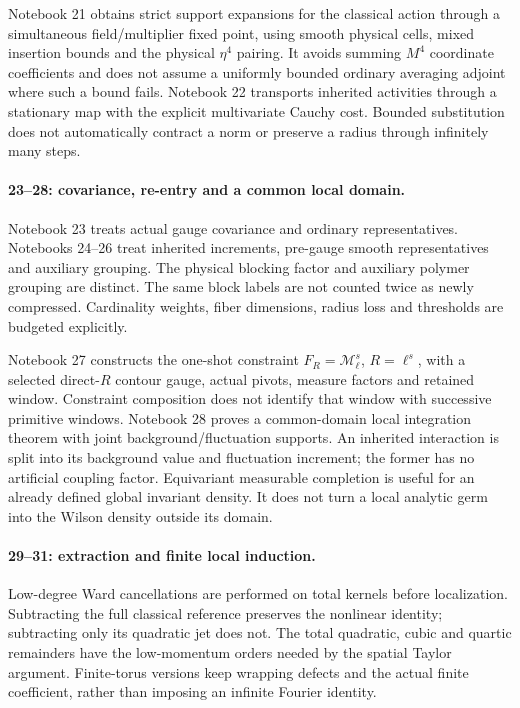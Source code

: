 \documentclass[11pt]{article}
\theoremstyle{remark}
\begin{document}
Notebook 21 obtains strict support expansions
for the classical action through a simultaneous
field/multiplier fixed point, using smooth
physical cells, mixed insertion bounds and
the physical \(\eta^4\) pairing. It avoids
summing \(M^4\) coordinate coefficients and
does not assume a uniformly bounded ordinary
averaging adjoint where such a bound fails.
Notebook 22 transports inherited activities
through a stationary map with the explicit
multivariate Cauchy cost. Bounded substitution
does not automatically contract a norm or
preserve a radius through infinitely many steps.

\paragraph{23--28: covariance, re-entry and a common local domain.}
Notebook 23 treats actual gauge covariance
and ordinary representatives. Notebooks
24--26 treat inherited increments, pre-gauge
smooth representatives and auxiliary grouping.
The physical blocking factor and auxiliary
polymer grouping are distinct. The same
block labels are not counted twice as newly
compressed. Cardinality weights, fiber
dimensions, radius loss and thresholds
are budgeted explicitly.

Notebook 27 constructs the one-shot constraint
\(F_R=\mathcal M_\ell^s\), \(R=\ell^s\),
with a selected direct-\(R\) contour gauge,
actual pivots, measure factors and retained
window. Constraint composition does not
identify that window with successive
primitive windows. Notebook 28 proves a
common-domain local integration theorem
with joint background/fluctuation supports.
An inherited interaction is split into its
background value and fluctuation increment;
the former has no artificial coupling factor.
Equivariant measurable completion is useful
for an already defined global invariant
density. It does not turn a local analytic
germ into the Wilson density outside its domain.

\paragraph{29--31: extraction and finite local induction.}
Low-degree Ward cancellations are performed
on total kernels before localization.
Subtracting the full classical reference
preserves the nonlinear identity; subtracting
only its quadratic jet does not.
The total quadratic, cubic and quartic
remainders have the low-momentum orders
needed by the spatial Taylor argument.
Finite-torus versions keep wrapping defects
and the actual finite coefficient, rather
than imposing an infinite Fourier identity.
\end{document}
